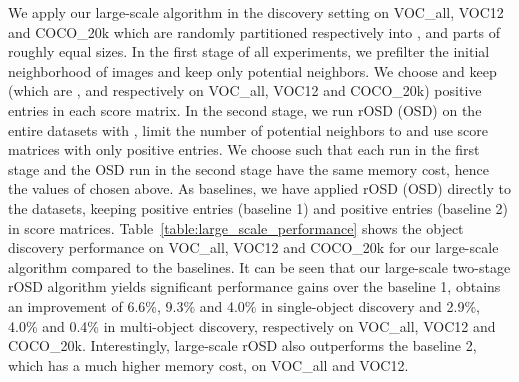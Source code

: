 \documentclass[runningheads]{llncs}
\begin{document}
\begin{table}[tb]
    \centering
    \caption{\small Multi-object colocalization and discovery performance of rOSD compared to competitors on VOC\_all and VOC12 datasets}
    \label{table:multiple_perf_all}
\end{table}

\label{sec:result_large_scale}
We apply our large-scale algorithm in the discovery setting on VOC\_all, VOC12 and COCO\_20k which are randomly partitioned respectively into ,  and  parts of roughly equal sizes. In the first stage of all experiments, we prefilter the initial neighborhood of images and keep only  potential neighbors. We choose  and keep  (which are ,  and  respectively on VOC\_all, VOC12 and COCO\_20k) positive entries in each score matrix. In the second stage, we run rOSD (OSD) on the entire datasets with , limit the number of potential neighbors to  and use score matrices with only  positive entries. We choose  such that each run in the first stage and the OSD run in the second stage have the same memory cost, hence the values of  chosen above. As baselines, we have applied rOSD (OSD) directly to the datasets, keeping  positive entries (baseline 1) and  positive entries (baseline 2) in score matrices. Table~\ref{table:large_scale_performance} shows the object discovery performance on VOC\_all, VOC12 and COCO\_20k for our large-scale algorithm compared to the baselines. It can be seen that our large-scale two-stage rOSD algorithm yields significant performance gains over the baseline 1, obtains an improvement of 6.6\%, 9.3\% and 4.0\% in single-object discovery and 2.9\%, 4.0\% and 0.4\% in multi-object discovery, respectively on VOC\_all, VOC12 and COCO\_20k. Interestingly, large-scale rOSD also outperforms the baseline 2, which has a much higher memory cost, on VOC\_all and VOC12.
\end{document}
